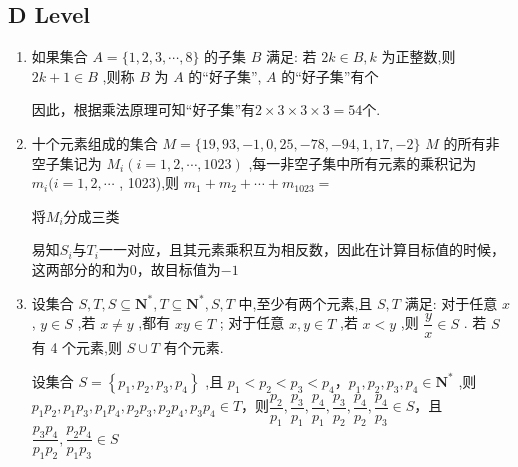 \subsection*{D Level}
\begin{enumerate}
    \item 如果集合 $A = \{ 1,2,3,\cdots ,8\}$ 的子集 $B$ 满足: 若 ${2k} \in  B,k$ 为正整数,则 ${2k} + 1 \in  B$ ,则称 $B$ 为 $A$ 的“好子集”, $A$ 的“好子集”有个
    \begin{jieda}
        因此，根据乘法原理可知“好子集”有$2\times3\times3\times3 = 54$个.
    \end{jieda}
    \item 十个元素组成的集合 $M = \{ {19},{93}, - 1,0,{25}, - {78}, - {94},1,{17}, - 2\}$  $M$ 的所有非空子集记为 ${M}_{i}\left( {i = 1,2,\cdots ,{1023}}\right)$ ,每一非空子集中所有元素的乘积记为 ${m}_{i}(i = 1,2,\cdots$ , 1023),则 ${m}_{1} + {m}_{2} + \cdots  + {m}_{1023} =$ 
    \begin{jieda}
        将$M_i$分成三类
        易知$S_i$与$T_i$一一对应，且其元素乘积互为相反数，因此在计算目标值的时候，这两部分的和为$0$，故目标值为$-1$
    \end{jieda}
    \item 设集合 $S,T,S \subseteq  {\mathbf{N}}^{ * },T \subseteq  {\mathbf{N}}^{ * },S,T$ 中,至少有两个元素,且 $S,T$ 满足: 对于任意 $x$ , $y \in  S$ ,若 $x \neq  y$ ,都有 ${xy} \in  T$ ; 对于任意 $x,y \in  T$ ,若 $x < y$ ,则 $\dfrac{y}{x} \in  S$ . 若 $S$ 有 4 个元素,则 $S \cup  T$ 有个元素.
    \begin{jieda}
        设集合 $S = \left\{  {{p}_{1},{p}_{2},{p}_{3},{p}_{4}}\right\}$ ,且 ${p}_{1} < {p}_{2} < {p}_{3} < {p}_{4}$，${p}_{1},{p}_{2},{p}_{3},{p}_{4} \in  {\mathbf{N}}^{ * }$ ,则 $p_1p_2, p_1p_3,p_1p_4, p_2p_3,p_2p_4,p_3p_4 \in  T$，则$\dfrac{p_2}{p_1},\dfrac{p_3}{p_1},\dfrac{p_4}{p_1},\dfrac{p_3}{p_2},\dfrac{p_4}{p_2},\dfrac{p_4}{p_3} \in S$，且$\dfrac{p_3p_4}{p_1p_2}, \dfrac{p_2p_4}{p_1p_3} \in S$


\end{jieda}
\end{enumerate}
